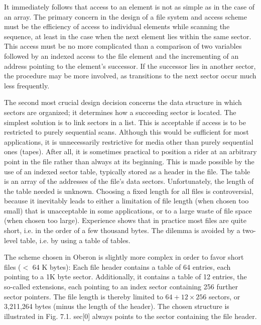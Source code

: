 It immediately follows that access to an element is not as simple as in the case of an array. The primary concern in the design of a file system and access scheme must be the efficiency of access to individual elements while scanning the sequence, at least in the case when the next element lies within the same sector. This access must be no more complicated than a comparison of two variables followed by an indexed access to the file element and the incrementing of an address pointing to the element's successor. If the successor lies in another sector, the procedure may be more involved, as transitions to the next sector occur much less frequently.

The second most crucial design decision concerns the data structure in which sectors are organized; it determines how a succeeding sector is located. The simplest solution is to link sectors in a list. This is acceptable if access is to be restricted to purely sequential scans. Although this would be sufficient for most applications, it is unnecessarily restrictive for media other than purely sequential ones (tapes). After all, it is sometimes practical to position a rider at an arbitrary point in the file rather than always at its beginning. This is made possible by the use of an indexed sector table, typically stored as a header in the file. The table is an array of the addresses of the file's data sectors. Unfortunately, the length of the table needed is unknown. Choosing a fixed length for all files is controversial, because it inevitably leads to either a limitation of file length (when chosen too small) that is unacceptable in some applications, or to a large waste of file space (when chosen too large). Experience shows that in practice most files are quite short, i.e. in the order of a few thousand bytes. The dilemma is avoided by a two-level table, i.e. by using a table of tables.

The scheme chosen in Oberon is slightly more complex in order to favor short files ($<$ 64 K bytes): Each file header contains a table of 64 entries, each pointing to a 1K byte sector. Additionally, it contains a table of 12 entries, the so-called extensions, each pointing to an index sector containing 256 further sector pointers. The file length is thereby limited to $64 + 12 \times 256$ sectors, or 3,211,264 bytes (minus the length of the header). The chosen structure is illustrated in Fig. 7.1. sec[0] always points to the sector containing the file header.


